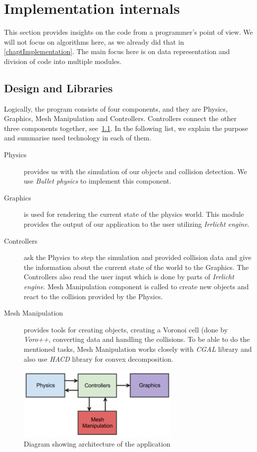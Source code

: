 \chapter{Implementation internals}
\label{app:implementation}

This section provides insights on the code from a programmer's point of view. We will not focus on algorithms here, as we already did that in \cref{chaptImplementation}. The main focus here is on data representation and division of code into multiple modules.

\section{Design and Libraries}
Logically, the program consists of four components, and they are Physics, Graphics, Mesh Manipulation and Controllers. Controllers connect the other three components together, see~\cref{fig:architecture}. In the following list, we explain the purpose and summarise used technology in each of them.
\begin{description}
\item[Physics] provides us with the simulation of our objects and collision detection. We use \emph{Bullet physics} to implement this component. 
\item[Graphics] is used for rendering the current state of the physics world. This module provides the output of our application to the user utilizing \emph{Irrlicht engine}.
\item[Controllers] ask the Physics to step the simulation and provided collision data and give the information about the current state of the world to the Graphics. The Controllers also read the user input which is done by parts of \emph{Irrlicht engine}. Mesh Manipulation component is called to create new objects and react to the collision provided by the Physics.
\item[Mesh Manipulation] provides tools for creating objects, creating a Voronoi cell (done by \emph{Voro++}, converting data and handling the collisions. To be able to do the mentioned tasks, Mesh Manipulation works closely with \emph{CGAL} library and also use \emph{HACD} library for convex decomposition.
\end{description}

\begin{figure}
        \centering
        \includegraphics[width=0.7\textwidth]{img/architecture}
        \caption{Diagram showing architecture of the application}
        \label{fig:architecture}
\end{figure}

